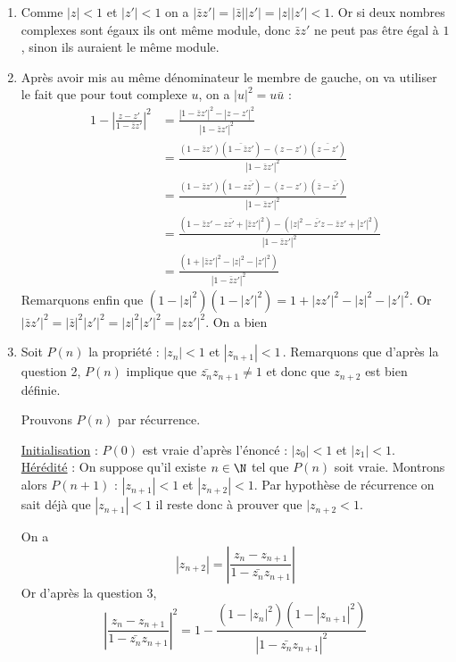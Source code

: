 \documentclass[a4paper, 11pt,reqno]{article}
\begin{document}
\begin{correction}
\begin{enumerate}
\item Comme $|z|<1$ et $|z'|<1$ on a $|\bar{z}z'|= |\bar{z}| |z'| =|z||z'| <1$. Or si deux nombres complexes sont égaux ils ont même module, donc $\bar{z}z' $ ne peut pas être égal à $1$, sinon ils auraient le même module. 
\item Après avoir mis au même dénominateur le membre de gauche, on va utiliser le fait que pour tout complexe $u$, on a $|u|^2 = u\bar{u}$ :
\begin{align*}
1- \left| \frac{z-z'}{1-\bar{z} z' } \right|^2  &= \frac{| 1-\bar{z} z' |^2 -|z-z' |^2}{|1-\bar{z} z'  |^2}\\
&= \frac{( 1-\bar{z} z' )(\bar{ 1-\bar{z} z'} )   -(z-z' )(\bar{z-z'})}{|1-\bar{z} z'  |^2}\\
&= \frac{( 1-\bar{z} z' )(1-z\bar{z'}  )   -(z-z' )(\bar{z}-\bar{z'})}{|1-\bar{z} z'  |^2}\\
&= \frac{( 1-\bar{z} z' -z\bar{z'} + |\bar{z}z'|^2  )   -(|z|^2-\bar{z'}z - \bar{z}z' +|z'|^2)}{|1-\bar{z} z'  |^2}\\
&= \frac{( 1+ |\bar{z}z'|^2-|z|^2-|z'|^2)}{|1-\bar{z} z'  |^2}
\end{align*}
Remarquons enfin que $(1-|z|^2) (1-|z'|^2)  =1 +|zz'|^2 -|z|^2 -|z'|^2$. Or 
$ |\bar{z}z'|^2 = |\bar{z}|^2|z'|^2 =|z|^2 |z'|^2  = |zz'|^2$.
On a bien 


\item Soit $P(n)$ la propriété : \og $|z_n|<1$ et $|z_{n+1}|<1$\fg \,. Remarquons que d'après la question 2, $P(n)$ implique que $\bar{z_n}z_{n+1}\neq 1 $ et donc que $z_{n+2}$ est bien définie. 

Prouvons $P(n)$ par récurrence. 

\underline{Initialisation} : 
$P(0)$ est vraie d'après l'énoncé : $|z_0|<1 $ et $|z_1|<1$.\\

\underline{Hérédité} : On suppose qu'il existe $n\in \N$   tel que $P(n)$ soit vraie. Montrons alors $P(n+1)$ :  \og $|z_{n+1}|<1$ et $|z_{n+2}|<1$\fg. Par hypothèse de récurrence on sait déjà que $|z_{n+1}|<1$ il reste donc à prouver que $|z_{n+2} <1$. 

On a $$|z_{n+2}| = \left|\frac{z_n-z_{n+1}}{1-\bar{z_{n}} z_{n+1}}\right|$$
 Or d'après la question 3, 
 $$ \left|\frac{z_n-z_{n+1}}{1-\bar{z_{n}} z_{n+1}}\right|^2 = 1- \frac{(1-|z_n|^2) (1-|z_{n+1}|^2) }{|1-\bar{z_n} z_{n+1}  |^2}$$
 

\end{enumerate}
\end{correction}
\end{document}
